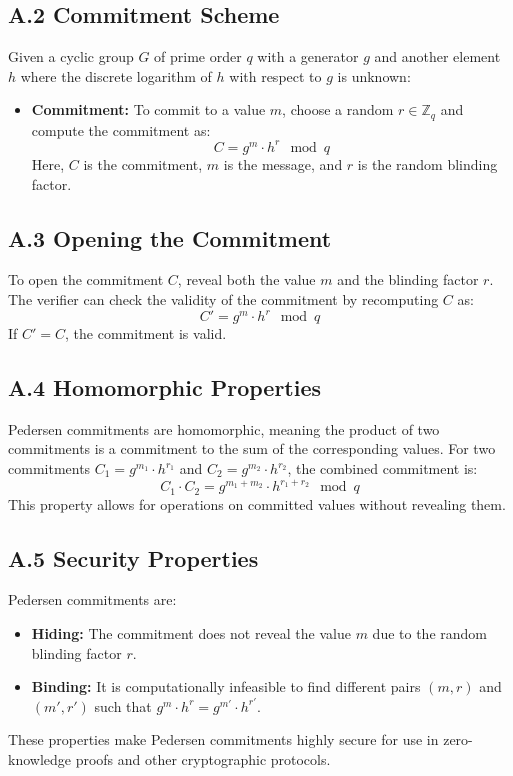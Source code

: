 \documentclass[12pt,a4paper]{report}
\begin{document}
\subsection{A.2 Commitment Scheme}
Given a cyclic group \( G \) of prime order \( q \) with a generator \( g \) and another element \( h \) where the discrete logarithm of \( h \) with respect to \( g \) is unknown:
\begin{itemize}
    \item \textbf{Commitment:} To commit to a value \( m \), choose a random \( r \in \mathbb{Z}_q \) and compute the commitment as:
    \[
    C = g^m \cdot h^r \mod q
    \]
    Here, \( C \) is the commitment, \( m \) is the message, and \( r \) is the random blinding factor.
\end{itemize}

\subsection{A.3 Opening the Commitment}
To open the commitment \( C \), reveal both the value \( m \) and the blinding factor \( r \). The verifier can check the validity of the commitment by recomputing \( C \) as:
\[
C' = g^m \cdot h^r \mod q
\]
If \( C' = C \), the commitment is valid.

\subsection{A.4 Homomorphic Properties}
Pedersen commitments are homomorphic, meaning the product of two commitments is a commitment to the sum of the corresponding values. For two commitments \( C_1 = g^{m_1} \cdot h^{r_1} \) and \( C_2 = g^{m_2} \cdot h^{r_2} \), the combined commitment is:
\[
C_1 \cdot C_2 = g^{m_1 + m_2} \cdot h^{r_1 + r_2} \mod q
\]
This property allows for operations on committed values without revealing them.

\subsection{A.5 Security Properties}
Pedersen commitments are:
\begin{itemize}
    \item \textbf{Hiding:} The commitment does not reveal the value \( m \) due to the random blinding factor \( r \).
    \item \textbf{Binding:} It is computationally infeasible to find different pairs \( (m, r) \) and \( (m', r') \) such that \( g^m \cdot h^r = g^{m'} \cdot h^{r'} \).
\end{itemize}
These properties make Pedersen commitments highly secure for use in zero-knowledge proofs and other cryptographic protocols.
\end{document}
